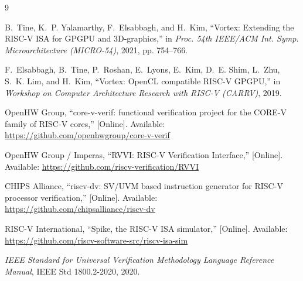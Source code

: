\documentclass[conference]{IEEEtran}
\begin{document}
\balance
\begin{thebibliography}{9}

B.~Tine, K.~P. Yalamarthy, F.~Elsabbagh, and H.~Kim,
``Vortex: Extending the RISC-V ISA for GPGPU and 3D-graphics,''
in \emph{Proc. 54th IEEE/ACM Int. Symp. Microarchitecture (MICRO-54)},
2021, pp. 754--766.

F.~Elsabbagh, B.~Tine, P.~Roshan, E.~Lyons, E.~Kim, D.~E. Shim,
L.~Zhu, S.~K. Lim, and H.~Kim,
``Vortex: OpenCL compatible RISC-V GPGPU,''
in \emph{Workshop on Computer Architecture Research with RISC-V (CARRV)},
2019.

OpenHW Group, ``core-v-verif: functional verification project for the
CORE-V family of RISC-V cores,'' [Online]. Available:
\url{https://github.com/openhwgroup/core-v-verif}

OpenHW Group / Imperas, ``RVVI: RISC-V Verification Interface,''
[Online]. Available: \url{https://github.com/riscv-verification/RVVI}

CHIPS Alliance, ``riscv-dv: SV/UVM based instruction generator for
RISC-V processor verification,'' [Online]. Available:
\url{https://github.com/chipsalliance/riscv-dv}

RISC-V International, ``Spike, the RISC-V ISA simulator,'' [Online].
Available: \url{https://github.com/riscv-software-src/riscv-isa-sim}

\emph{IEEE Standard for Universal Verification Methodology Language
Reference Manual}, IEEE Std 1800.2-2020, 2020.

\end{thebibliography}
\end{document}
